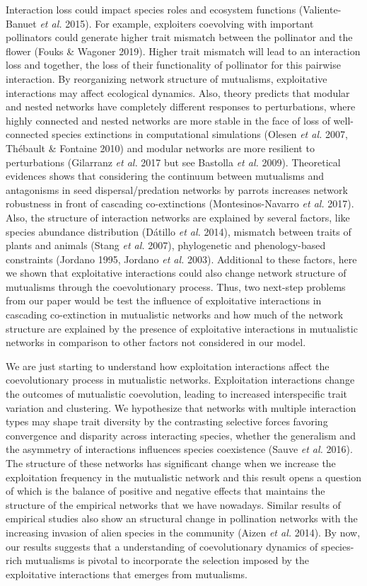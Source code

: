\documentclass[a4paper, 12pt]{article}
\begin{document}
Interaction loss could impact species roles and ecosystem functions (Valiente-Banuet \textit{et al.} 2015). For example, exploiters coevolving with important pollinators could generate higher trait mismatch between the pollinator and the flower (Fouks \& Wagoner 2019). Higher trait mismatch will lead to an interaction loss and together, the loss of their functionality of pollinator for this pairwise interaction. By reorganizing network structure of mutualisms, exploitative interactions may affect ecological dynamics. Also, theory predicts that modular and nested networks have completely different responses to perturbations, where highly connected and nested networks are more stable in the face of loss of well-connected species extinctions in computational simulations (Olesen \textit{et al.} 2007, Thébault \& Fontaine 2010) and modular networks are more resilient to perturbations (Gilarranz \textit{et al.} 2017 but see Bastolla \textit{et al.} 2009). Theoretical evidences shows that considering the continuum between mutualisms and antagonisms in seed dispersal/predation networks by parrots increases network robustness in front of cascading co-extinctions (Montesinos-Navarro \textit{et al.} 2017). Also, the structure of interaction networks are explained by several factors, like species abundance distribution (Dátillo \textit{et al.} 2014), mismatch between traits of plants and animals (Stang \textit{et al.} 2007), phylogenetic and phenology-based constraints (Jordano 1995, Jordano \textit{et al.} 2003). Additional to these factors, here we shown that exploitative interactions could also change network structure of mutualisms through the coevolutionary process. Thus, two next-step problems from our paper would be test the influence of exploitative interactions in cascading co-extinction in mutualistic networks and how much of the network structure are explained by the presence of exploitative interactions in mutualistic networks in comparison to other factors not considered in our model.

We are just starting to understand how exploitation interactions affect the coevolutionary process in mutualistic networks. Exploitation interactions change the outcomes of mutualistic coevolution, leading to increased interspecific trait variation and clustering. We hypothesize that networks with multiple interaction types may shape trait diversity by the contrasting selective forces favoring convergence and disparity across interacting species, whether the generalism and the asymmetry of interactions influences species coexistence (Sauve \textit{et al.} 2016). The structure of these networks has significant change when we increase the exploitation frequency in the mutualistic network and this result opens a question of which is the balance of positive and negative effects that maintains the structure of the empirical networks that we have nowadays. Similar results of empirical studies also show an structural change in pollination networks with the increasing invasion of alien species in the community (Aizen \textit{et al.} 2014). By now, our results suggests that a understanding of coevolutionary dynamics of species-rich mutualisms is pivotal to incorporate the selection imposed by the exploitative interactions that emerges from mutualisms.
\end{document}
